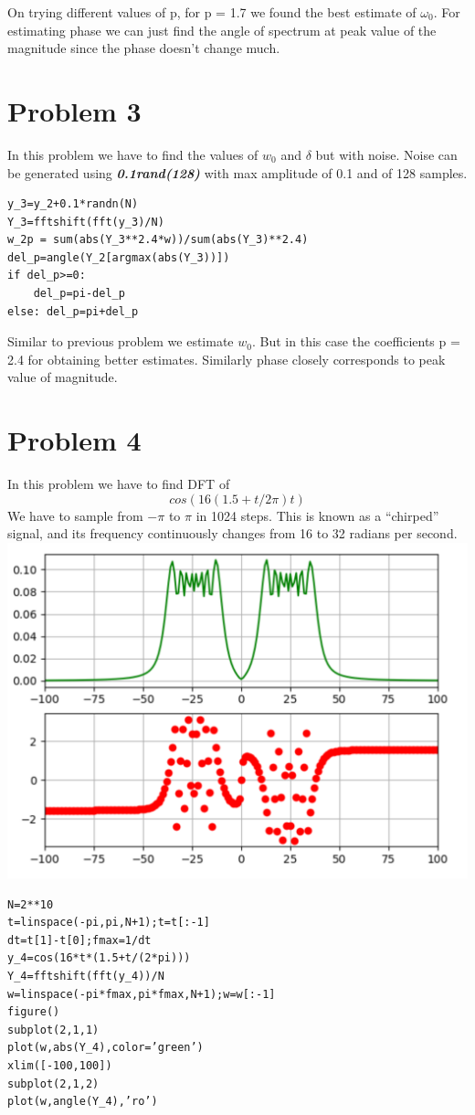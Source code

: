 \documentclass[10pt,english, openany]{book}
\begin{document}
On trying different values of p, for p = 1.7 we found the best estimate of $\omega_{0}$.
For estimating phase we can just find the angle of spectrum at peak value of the magnitude since the phase doesn’t change much.


\section{Problem 3}
In this problem we have to find the values of $w_{0}$ and $\delta$ but with noise. Noise can be generated using \textbf{\textit{0.1rand(128)}} with max amplitude of 0.1 and of 128 samples.\\

\begin{verbatim}
y_3=y_2+0.1*randn(N)
Y_3=fftshift(fft(y_3)/N)
w_2p = sum(abs(Y_3**2.4*w))/sum(abs(Y_3)**2.4)
del_p=angle(Y_2[argmax(abs(Y_3))])
if del_p>=0:
	del_p=pi-del_p
else: del_p=pi+del_p
\end{verbatim}


Similar to previous problem we estimate $w_{0}$. But in this case the coefficients p = 2.4 for obtaining better estimates. Similarly phase closely corresponds to peak value of magnitude.

\section{Problem 4}
In this problem we have to find DFT of\\
\begin{equation*}
cos(16(1.5 + t/2\pi )t)
\end{equation*}
We have to sample from $-\pi$ to $\pi$ in 1024 steps. This is known as a “chirped” signal, and its frequency continuously changes from 16 to 32 radians per second.\\
{\centering \includegraphics[scale=0.3]{Figure7.png}}\\
\begin{verbatim}
N=2**10
t=linspace(-pi,pi,N+1);t=t[:-1]
dt=t[1]-t[0];fmax=1/dt 
y_4=cos(16*t*(1.5+t/(2*pi)))
Y_4=fftshift(fft(y_4))/N 
w=linspace(-pi*fmax,pi*fmax,N+1);w=w[:-1] 
figure()
subplot(2,1,1) 
plot(w,abs(Y_4),color=’green’) 
xlim([-100,100])
subplot(2,1,2) 
plot(w,angle(Y_4),’ro’)
\end{verbatim}
\end{document}
